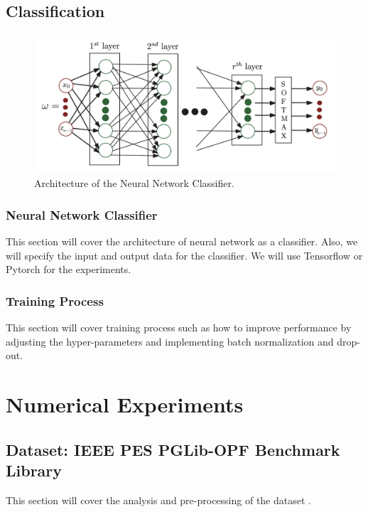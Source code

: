 \documentclass[11pt]{article}
\begin{document}
\subsection{Classification}
\begin{figure}[h]\label{fig:nns_arch}
\centering
\includegraphics[scale=0.31]{report/figure/NNs arch.png}
\caption{Architecture of the Neural Network Classifier. \cite{10.1109/ptc.2019.8810819}}
\end{figure}
\subsubsection{Neural Network Classifier}
This section will cover the architecture of neural network as a classifier. Also, we will specify the input and output data for the classifier. We will use Tensorflow or Pytorch for the experiments. 

\subsubsection{Training Process}
This section will cover training process such as how to improve performance by adjusting the hyper-parameters and implementing batch normalization and drop-out.



\section{Numerical Experiments}\label{sec:tests}
\subsection{Dataset:  IEEE PES PGLib-OPF Benchmark Library}
This section will cover the analysis and pre-processing of the dataset \cite{pglib-opf}. 
\end{document}
